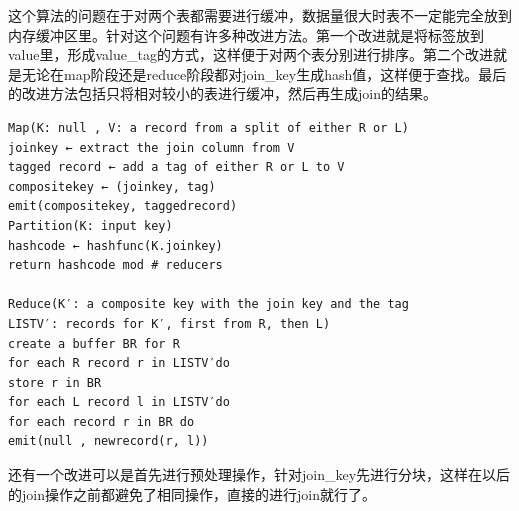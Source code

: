 这个算法的问题在于对两个表都需要进行缓冲，数据量很大时表不一定能完全放到内存缓冲区里。针对这个问题有许多种改进方法。第一个改进就是将标签放到value里，形成value\_tag的方式，这样便于对两个表分别进行排序。第二个改进就是无论在map阶段还是reduce阶段都对join\_key生成hash值，这样便于查找。最后的改进方法包括只将相对较小的表进行缓冲，然后再生成join的结果。
\begin{lstlisting}
Map(K: null , V: a record from a split of either R or L)
joinkey ← extract the join column from V
tagged record ← add a tag of either R or L to V
compositekey ← (joinkey, tag)
emit(compositekey, taggedrecord)
Partition(K: input key)
hashcode ← hashfunc(K.joinkey)
return hashcode mod # reducers

Reduce(K′: a composite key with the join key and the tag 
LISTV′: records for K′, first from R, then L)
create a buffer BR for R
for each R record r in LISTV′do
store r in BR
for each L record l in LISTV′do
for each record r in BR do
emit(null , newrecord(r, l))
\end{lstlisting}

还有一个改进可以是首先进行预处理操作，针对join\_key先进行分块，这样在以后的join操作之前都避免了相同操作，直接的进行join就行了。